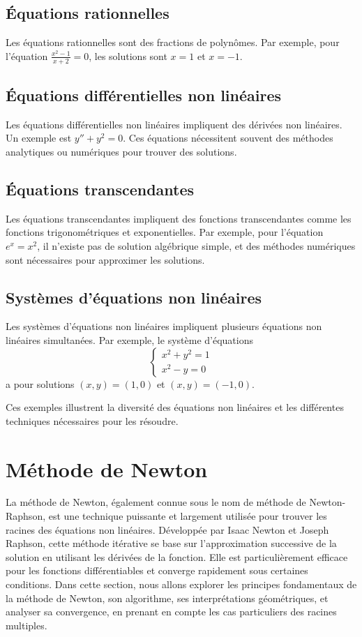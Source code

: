 \documentclass{article}
\begin{document}
\subsection{Équations rationnelles}
Les équations rationnelles sont des fractions de polynômes. Par exemple, pour l'équation $\frac{x^2 - 1}{x + 2} = 0$, les solutions sont $x = 1$ et $x = -1$.

\subsection{Équations différentielles non linéaires}
Les équations différentielles non linéaires impliquent des dérivées non linéaires. Un exemple est $y'' + y^2 = 0$. Ces équations nécessitent souvent des méthodes analytiques ou numériques pour trouver des solutions.

\subsection{Équations transcendantes}
Les équations transcendantes impliquent des fonctions transcendantes comme les fonctions trigonométriques et exponentielles. Par exemple, pour l'équation $e^x = x^2$, il n'existe pas de solution algébrique simple, et des méthodes numériques sont nécessaires pour approximer les solutions.

\subsection{Systèmes d'équations non linéaires}
Les systèmes d'équations non linéaires impliquent plusieurs équations non linéaires simultanées. Par exemple, le système d'équations
\[
\begin{cases} 
x^2 + y^2 = 1 \\ 
x^2 - y = 0 
\end{cases} 
\]
a pour solutions $(x, y) = (1, 0)$ et $(x, y) = (-1, 0)$.

Ces exemples illustrent la diversité des équations non linéaires et les différentes techniques nécessaires pour les résoudre.

\section{Méthode de Newton}

La méthode de Newton, également connue sous le nom de méthode de Newton-Raphson, est une technique puissante et largement utilisée pour trouver les racines des équations non linéaires. Développée par Isaac Newton et Joseph Raphson, cette méthode itérative se base sur l'approximation successive de la solution en utilisant les dérivées de la fonction. Elle est particulièrement efficace pour les fonctions différentiables et converge rapidement sous certaines conditions. Dans cette section, nous allons explorer les principes fondamentaux de la méthode de Newton, son algorithme, ses interprétations géométriques, et analyser sa convergence, en prenant en compte les cas particuliers des racines multiples.
\end{document}
